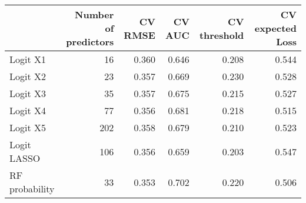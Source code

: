 
\begin{tabular}{lrrrrr}
\toprule
  & Number of predictors & CV RMSE & CV AUC & CV threshold & CV expected Loss\\
\midrule
Logit X1 & 16 & 0.360 & 0.646 & 0.208 & 0.544\\
Logit X2 & 23 & 0.357 & 0.669 & 0.230 & 0.528\\
Logit X3 & 35 & 0.357 & 0.675 & 0.215 & 0.527\\
Logit X4 & 77 & 0.356 & 0.681 & 0.218 & 0.515\\
Logit X5 & 202 & 0.358 & 0.679 & 0.210 & 0.523\\
Logit LASSO & 106 & 0.356 & 0.659 & 0.203 & 0.547\\
RF probability & 33 & 0.353 & 0.702 & 0.220 & 0.506\\
\bottomrule
\end{tabular}